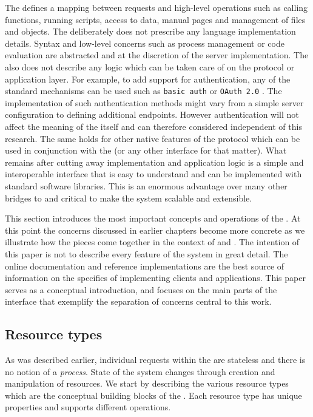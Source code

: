 The \OpenCPU \API defines a mapping between \HTTP requests and high-level operations such as calling functions, running scripts, access to data, manual pages and management of files and objects. The \API deliberately does not prescribe any language implementation details. Syntax and low-level concerns such as process management or code evaluation are abstracted and at the discretion of the server implementation. The \API also does not describe any logic which can be taken care of on the protocol or application layer. For example, to add support for authentication, any of the standard mechanisms can be used such as \texttt{basic auth} \citep{franks1999rfc} or \texttt{OAuth 2.0} \citep{hardt2012oauth}. The implementation of such authentication methods might vary from a simple server configuration to defining additional endpoints. However authentication will not affect the meaning of the \API itself and can therefore considered independent of this research. The same holds for other native features of the \HTTP protocol which can be used in conjunction with the \OpenCPU \API (or any other \HTTP interface for that matter). What remains after cutting away implementation and application logic is a simple and interoperable interface that is easy to understand and can be implemented with standard \HTTP software libraries. This is an enormous advantage over many other bridges to \R and critical to make the system scalable and extensible. 

This section introduces the most important concepts and operations of the \API. At this point the concerns discussed in earlier chapters become more concrete as we illustrate how the pieces come together in the context of \R and \HTTP. The intention of this paper is not to describe every feature of the system in great detail. The online documentation and reference implementations are the best source of information on the specifics of implementing clients and applications. This paper serves as a conceptual introduction, and focuses on the main parts of the interface that exemplify the separation of concerns central to this work. 

\subsection{Resource types}

As was described earlier, individual requests within the \OpenCPU \API are stateless and there is no notion of a \emph{process}. State of the system changes through creation and manipulation of resources. We start by describing the various resource types which are the conceptual building blocks of the \API. Each resource type has unique properties and supports different operations.

